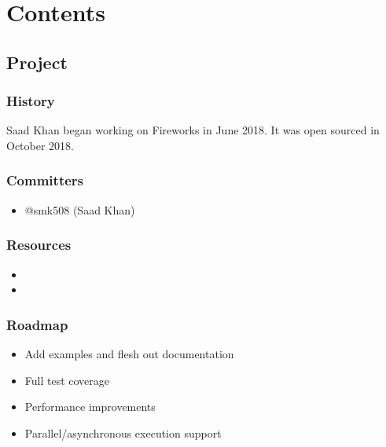 \documentclass[letterpaper,10pt,english]{sphinxmanual}
\begin{document}
\chapter{Contents}
\label{\detokenize{index:contents}}

\section{Project}
\label{\detokenize{Project:project}}\label{\detokenize{Project::doc}}

\subsection{History}
\label{\detokenize{Project:history}}
Saad Khan began working on Fireworks in June 2018. It was open sourced in October 2018.


\subsection{Committers}
\label{\detokenize{Project:committers}}\begin{itemize}
\item {} 
@smk508 (Saad Khan)

\end{itemize}


\subsection{Resources}
\label{\detokenize{Project:resources}}\begin{itemize}
\item {} 

\item {} 

\end{itemize}


\subsection{Roadmap}
\label{\detokenize{Project:roadmap}}\begin{itemize}
\item {} 
Add examples and flesh out documentation

\item {} 
Full test coverage

\item {} 
Performance improvements

\item {} 
Parallel/asynchronous execution support

\end{itemize}
\end{document}
